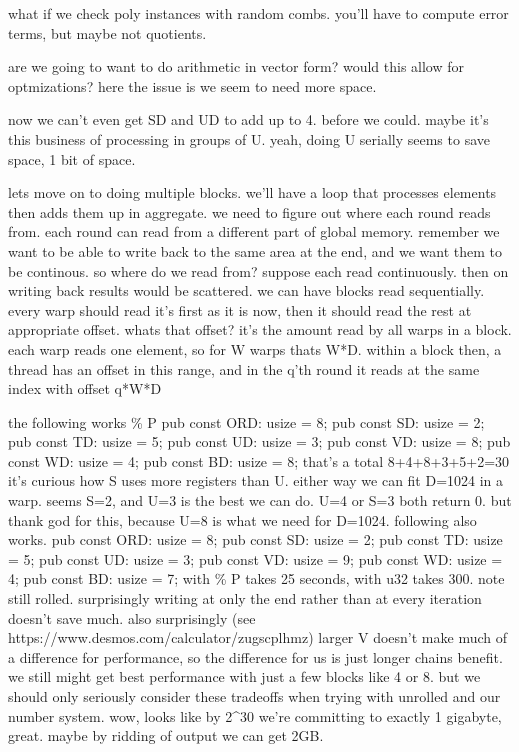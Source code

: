 what if we check poly instances with random combs. you'll have to compute error terms, but maybe not quotients. 

are we going to want to do arithmetic in vector form? would this allow for optmizations? here the issue is we seem to need more space. 

now we can't even get SD and UD to add up to 4. before we could. maybe it's this business of processing in groups of U.
yeah, doing U serially seems to save space, 1 bit of space. 


lets move on to doing multiple blocks.
we'll have a loop that processes elements then adds them up in aggregate. 
we need to figure out where each round reads from. 
each round can read from a different part of global memory. remember we want to be able to write back to the same area at the end, and we want them to be continous. 
so where do we read from? suppose each read continuously. then on writing back results would be scattered. we can have blocks read sequentially. every warp should read it's first as it is now, then it should read the rest at appropriate offset. whats that offset? it's the amount read by all warps in a block. each warp reads one element, so for W warps thats W*D. 
within a block then, a thread has an offset in this range, and in the q'th round it reads at the same index with offset q*W*D



the following works \% P
pub const ORD: usize = 8;
pub const SD: usize = 2;
pub const TD: usize = 5;
pub const UD: usize = 3;
pub const VD: usize = 8;
pub const WD: usize = 4;
pub const BD: usize = 8;
that's a total 8+4+8+3+5+2=30
it's curious how S uses more registers than U. either way we can fit D=1024 in a warp. 
seems S=2, and U=3 is the best we can do. U=4 or S=3 both return 0.
but thank god for this, because U=8 is what we need for D=1024.
following also works.
pub const ORD: usize = 8;
pub const SD: usize = 2;
pub const TD: usize = 5;
pub const UD: usize = 3;
pub const VD: usize = 9;
pub const WD: usize = 4;
pub const BD: usize = 7;
with \% P takes 25 seconds, with u32 takes 300. note still rolled. 
surprisingly writing at only the end rather than at every iteration doesn't save much. 
also surprisingly (see https://www.desmos.com/calculator/zugscplhmz) larger V doesn't make much of a difference for performance, so the difference for us is just longer chains benefit. we still might get best performance with just a few blocks like 4 or 8.
but we should only seriously consider these tradeoffs when trying with unrolled and our number system. 
wow, looks like by 2^30 we're committing to exactly 1 gigabyte, great. maybe by ridding of output we can get 2GB.


